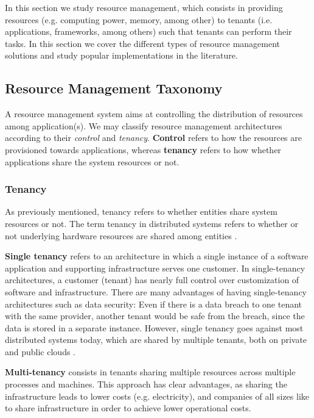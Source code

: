
In this section we study resource management, which consists in providing resources (e.g. computing power, memory, among other) to tenants (i.e. applications, frameworks, among others) such that tenants can perform their tasks. In this section we cover the different types of resource management solutions and study popular implementations in the literature.

\subsection{Resource Management Taxonomy}

A resource management system aims at controlling the distribution of resources among application(s). We may classify resource management architectures according to their \textit{control} and \textit{tenancy}. \textbf{Control} refers to how the resources are provisioned towards applications, whereas \textbf{tenancy} refers to how whether applications share the system resources or not.

\subsubsection{Tenancy}

As previously mentioned, tenancy refers to whether entities share system resources or not. The term tenancy in distributed systems refers to whether or not underlying hardware resources are shared among entities \cite{Hong2019}.

\textbf{Single tenancy} refers to an architecture in which a single instance of a software application and supporting infrastructure serves one customer. In single-tenancy architectures, a customer (tenant) has nearly full control over customization of software and infrastructure. There are many advantages of having single-tenancy architectures such as data security: Even if there is a data breach to one tenant with the same provider, another tenant would be safe from the breach, since the data is stored in a separate instance. However, single tenancy goes against most distributed systems today, which are shared by multiple tenants, both on private and public clouds \cite{mace2015retro}.

\textbf{Multi-tenancy} consists in tenants sharing multiple resources across multiple processes and machines. This approach has clear advantages, as sharing the infrastructure leads to lower costs (e.g. electricity), and companies of all sizes like to share infrastructure in order to achieve lower operational costs. 

